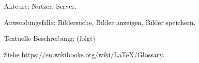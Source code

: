 \documentclass[parskip=full]{scrartcl}
\begin{document}
Akteure: Nutzer, Server.

Anwendungsfälle: Bildersuche, Bilder anzeigen, Bilder speichern.

Textuelle Beschreibung: (folgt)



%
%
\printnoidxglossaries
Siehe \url{https://en.wikibooks.org/wiki/LaTeX/Glossary}.
\end{document}
